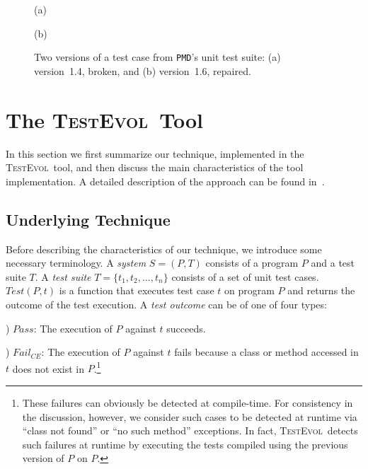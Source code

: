 \documentclass[conference]{IEEEtran}
\newcommand{\subject}[1]{\texttt{\small #1}}
\newcommand{\mt}{\mathit}
\newcommand{\pass}{\mt{Pass}}
\newcommand{\failce}{\mt{Fail}_{CE}}
\newcommand{\testfunc}[2]{\mt{Test(#1, #2)}}
\newcommand{\tool}{\textsc{TestEvol}\xspace}
\begin{document}
\begin{figure}[t]

\vspace*{-4pt}
\centerline{(a)}

\vspace*{-4pt}
\centerline{(b)}
\vspace*{-8pt}
\caption{Two versions of a test case from \subject{PMD}'s unit test
  suite: (a) version~1.4, broken, and (b) version~1.6, repaired.}
\vspace*{-12pt}
\label{fig:pmd-javatokenizertest}
\end{figure}

\section{The \tool\ Tool}
\label{sec:test-evolution}

In this section we first summarize our technique, implemented in the
\tool\ tool, and then discuss the main characteristics of the tool
implementation. A detailed description of the approach can be found
in~\cite{pinto12}.

\subsection{Underlying Technique}

Before describing the characteristics of our technique, we introduce
some necessary terminology.  A \textit{system} $S = (P, T)$ consists
of a program $P$ and a test suite $T$.  A \textit{test suite} $T =
\{t_1, t_2, \ldots, t_n\}$ consists of a set of unit test cases.
$\testfunc{P}{t}$ is a function that executes test case $t$ on program
$P$ and returns the outcome of the test execution.  A \textit{test
  outcome} can be of one of four types:

) $\pass$: The execution of $P$ against $t$ succeeds.

) $\failce$: The execution of $P$ against $t$ fails because a class
or method accessed in $t$ does not exist in $P$.\footnote{\small These
  failures can obviously be detected at compile-time. For consistency
  in the discussion, however, we consider such cases to be detected at
  runtime via ``class not found'' or ``no such method'' exceptions. In
  fact, \tool\ detects such failures at runtime by executing the tests
  compiled using the previous version of $P$ on $P$.}
\end{document}
